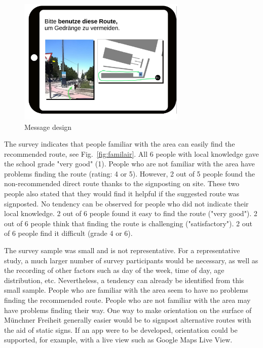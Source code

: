 \begin{figure}[hbt!]
\centering
\includegraphics[width=8cm]{../figures/appendix/onsite.png} 
\caption[Message design]{Message design}
\label{fig:msg}
\end{figure}


The survey indicates that people familiar with the area can easily find the recommended route, see Fig.~\ref{fig:familair}. All 6 people with local knowledge gave the school grade "very good" (1). People who are not familiar with the area have problems finding the route (rating: 4 or 5). However, 2 out of 5 people found the non-recommended direct route thanks to the signposting on site. These two people also stated that they would find it helpful if the suggested route was signposted. No tendency can be observed for people who did not indicate their local knowledge. 2 out of 6 people found it easy to find the route ("very good"). 2 out of 6 people think that finding the route is challenging ("satisfactory"). 2 out of 6 people find it difficult (grade 4 or 6).

The survey sample was small and is not representative. For a representative study, a much larger number of survey participants would be necessary, as well as the recording of other factors such as day of the week, time of day, age distribution, etc. 
Nevertheless, a tendency can already be identified from this small sample. People who are familiar with the area seem to have no problems finding the recommended route. People who are not familiar with the area may have problems finding their way. 
One way to make orientation on the surface of Münchner Freiheit generally easier would be to signpost alternative routes with the aid of static signs. If an app were to be developed, orientation could be supported, for example, with a live view such as Google Maps Live View.




